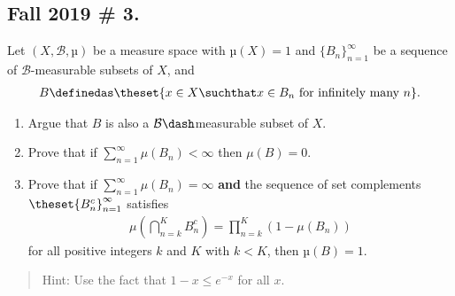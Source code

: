\hypertarget{fall-2019-3.}{%
\subsection{Fall 2019 \# 3.}\label{fall-2019-3.}}

Let \((X, \mathcal B, µ)\) be a measure space with \(µ(X) = 1\) and
\(\{B_n\}_{n=1}^\infty\) be a sequence of \(\mathcal B\)-measurable
subsets of \(X\), and
\begin{align*}
B \definedas \theset{x\in X \suchthat x\in B_n \text{ for infinitely many } n}.
\end{align*}

\begin{enumerate}
\def\labelenumi{\alph{enumi}.}
\item
  Argue that \(B\) is also a \(\mathcal{B} \dash\)measurable subset of
  \(X\).
\item
  Prove that if \(\sum_{n=1}^\infty \mu(B_n) < \infty\) then
  \(\mu(B)= 0\).
\item
  Prove that if \(\sum_{n=1}^\infty \mu(B_n) = \infty\) \textbf{and} the
  sequence of set complements \(\theset{B_n^c}_{n=1}^\infty\) satisfies
  \begin{align*}
  \mu\left(\bigcap_{n=k}^{K} B_{n}^{c}\right)=\prod_{n=k}^{K}\left(1-\mu\left(B_{n}\right)\right)
  \end{align*} for all positive integers \(k\) and \(K\) with \(k < K\),
  then \(µ(B) = 1\).
\end{enumerate}

\begin{quote}
Hint: Use the fact that \(1 - x ≤ e^{-x}\) for all \(x\).
\end{quote}

